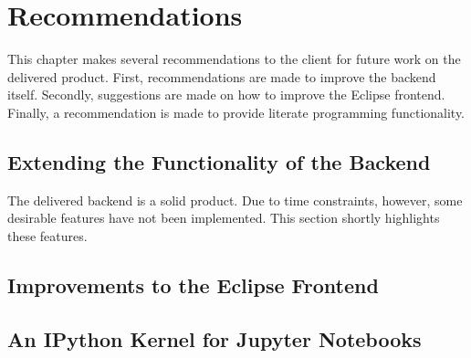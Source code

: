 \chapter{Recommendations} \label{cha:recommendations}

This chapter makes several recommendations to the client for future work on the
delivered product. First, recommendations are made to improve the backend
itself. Secondly, suggestions are made on how to improve the Eclipse frontend.
Finally, a recommendation is made to provide literate programming functionality.

\section{Extending the Functionality of the Backend}
\label{sec:impr-backend}

The delivered backend is a solid product. Due to time constraints, however, some
desirable features have not been implemented. This section shortly highlights
these features.







\section{Improvements to the Eclipse Frontend}
\label{sec:impr-eclipse}



\section{An IPython Kernel for Jupyter Notebooks}
\label{sec:discuss-literate-programming}



